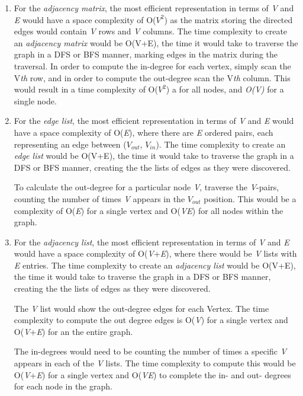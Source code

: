\documentclass[12pt]{article}
\begin{document}
\begin{enumerate}
\begin{enumerate}
    \item For the \textit{adjacency matrix}, the most efficient representation in terms of \textit{V} and \textit{E} would have a space complexity of O($V^{2}$) as the matrix storing the directed edges would contain \textit{V} rows and \textit{V} columns. The time complexity to create an \textit{adjacency matrix} would be O(V+E), the time it would take to traverse the graph in a DFS or BFS manner, marking edges in the matrix during the traversal. 
    In order to compute the in-degree for each vertex, simply scan the V\textit{th} row, and in order to compute the out-degree scan the V\textit{th} column. This would result in a time complexity of O($V^{2}$) a for all nodes, and \textit{O(V)} for a single node.
    
    \item For the \textit{edge list}, the most efficient representation in terms of \textit{V} and \textit{E} would have a space complexity of O(\textit{E}), where there are \textit{E} ordered pairs, each representing an edge between ($V_{out}$, $V_{in}$). The time complexity to create an \textit{edge list} would be O(V+E), the time it would take to traverse the graph in a DFS or BFS manner, creating the the lists of edges as they were discovered.
    
    To calculate the out-degree for a particular node \textit{V}, traverse the \textit{V}-pairs, counting the number of times \textit{V} appears in the \textit{$V_{out}$} position. This would be a complexity of O(\textit{E}) for a single vertex and O(\textit{VE}) for all nodes within the graph.
    
    \item For the \textit{adjacency list}, the most efficient representation in terms of \textit{V} and \textit{E} would have a space complexity of O(\textit{V}+\textit{E}), where there would be \textit{V} lists with \textit{E} entries. The time complexity to create an \textit{adjacency list} would be O(V+E), the time it would take to traverse the graph in a DFS or BFS manner, creating the the lists of edges as they were discovered.
    
    The \textit{V} list would show the out-degree edges for each Vertex. The time complexity to compute the out degree edges is O(\textit{V}) for a single vertex and O(\textit{V}+\textit{E}) for an the entire graph. 
    
    The in-degrees would need to be counting the number of times a specific \textit{V} appears in each of the \textit{V} lists. The time complexity to compute this would be O(\textit{V}+\textit{E}) for a single vertex and O(\textit{VE}) to complete the in- and out- degrees for each node in the graph.
\end{enumerate}
\pagebreak	


\end{enumerate}
\end{document}
